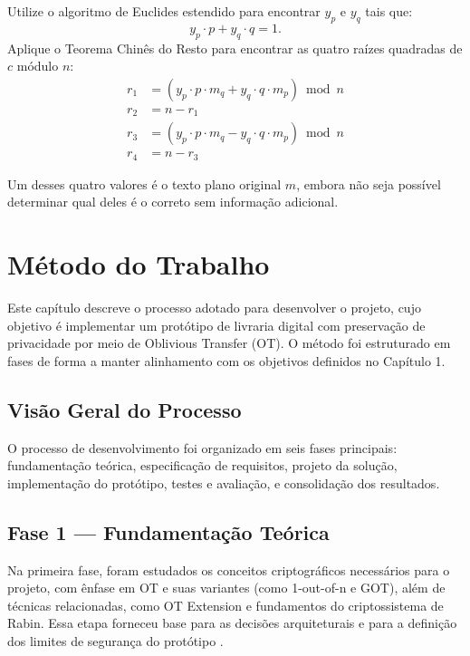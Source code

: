\documentclass[12pt, oneside, a4paper, english, brazil]{abntex2}
\begin{document}
Utilize o algoritmo de Euclides estendido para encontrar $y_p$ e $y_q$ tais
que:
\[
y_p \cdot p + y_q \cdot q = 1.
\]
Aplique o Teorema Chinês do Resto para encontrar as quatro raízes quadradas de
$c$ módulo $n$:
\begin{align*}
r_1 &= (y_p \cdot p \cdot m_q + y_q \cdot q \cdot m_p) \bmod n \\
r_2 &= n - r_1 \\
r_3 &= (y_p \cdot p \cdot m_q - y_q \cdot q \cdot m_p) \bmod n \\
r_4 &= n - r_3
\end{align*}

Um desses quatro valores é o texto plano original $m$, embora não seja
possível determinar qual deles é o correto sem informação adicional.

\chapter{Método do Trabalho}\label{cap:metodo}

Este capítulo descreve o processo adotado para desenvolver o projeto, cujo
objetivo é implementar um protótipo de livraria digital com preservação de
privacidade por meio de Oblivious Transfer (OT). O método foi estruturado em
fases de forma a manter alinhamento com os objetivos definidos no Capítulo 1.

\section{Visão Geral do Processo}

O processo de desenvolvimento foi organizado em seis fases principais:
fundamentação teórica, especificação de requisitos, projeto da solução,
implementação do protótipo, testes e avaliação, e consolidação dos resultados.

\section{Fase 1 --- Fundamentação Teórica}

Na primeira fase, foram estudados os conceitos criptográficos necessários para
o projeto, com ênfase em OT e suas variantes (como 1-out-of-n e GOT), além de
técnicas relacionadas, como OT Extension e fundamentos do criptossistema de
Rabin. Essa etapa forneceu base para as decisões arquiteturais e para a
definição dos limites de segurança do protótipo \cite{rabin2005, tassa2011}.
\end{document}
